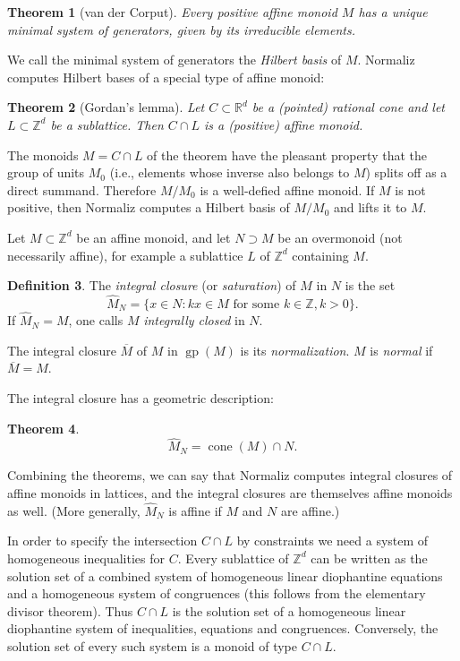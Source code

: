 \documentclass[12pt,a4paper]{scrartcl}
\newtheorem{theorem}{Theorem}
\theoremstyle{definition}
\newtheorem{definition}[theorem]{Definition}
\def\ZZ{{\mathbb Z}}
\def\RR{{\mathbb R}}
\DeclareMathOperator{\gp}{gp}
\DeclareMathOperator{\cone}{cone}
\begin{document}
\begin{theorem}[van der Corput]
	Every positive affine monoid $M$ has a unique minimal system of generators, given by its irreducible elements.
\end{theorem}

We call the minimal system of generators the \emph{Hilbert basis} of $M$. Normaliz computes Hilbert bases of a special type of affine monoid:

\begin{theorem}[Gordan's lemma]
	Let $C\subset\RR^d$ be a (pointed) rational cone and let $L\subset \ZZ^d$ be a sublattice. Then $C\cap L$ is a (positive) affine monoid.
\end{theorem}

The monoids $M=C\cap L$ of the theorem have the pleasant property that the group of units $M_0$ (i.e., elements whose inverse also belongs to $M$) splits off as a direct summand. Therefore $M/M_0$ is a well-defied affine monoid. If $M$ is not positive, then Normaliz computes a Hilbert basis of $M/M_0$ and lifts it to $M$.

Let $M\subset \ZZ^d$ be an affine monoid, and let $N\supset M$ be an overmonoid (not necessarily affine), for example a sublattice $L$ of $\ZZ^d$ containing $M$.

\begin{definition}
	The \emph{integral closure} (or \emph{saturation}) of $M$ in $N$ is the set
	$$
	\widehat M_N=\{x\in N: kx\in M \text{ for some } k\in \ZZ, k>0\}.
	$$
	If $\widehat M_N=M$, one calls $M$ \emph{integrally closed} in $N$.
	
	The integral closure $\overline M$ of $M$ in $\gp(M)$ is its \emph{normalization}. $M$ is \emph{normal} if $\overline M=M$.
\end{definition}

The integral closure has a geometric description:

\begin{theorem}\label{incl_cone}
	$$
	\widehat M_N =\cone(M)\cap N.
	$$
\end{theorem}

Combining the theorems, we can say that Normaliz computes integral closures of affine monoids in lattices, and the integral closures are themselves affine monoids as well. (More generally, $\widehat M_N$ is affine if $M$ and $N$ are affine.)

In order to specify the intersection $C\cap L$ by constraints we need a system of homogeneous inequalities for $C$. Every sublattice of $\ZZ^d$ can be written as the solution set of a combined system of homogeneous linear diophantine equations and a homogeneous system of congruences (this follows from the elementary divisor theorem). Thus $C\cap L$ is the solution set of a homogeneous linear diophantine system of inequalities, equations and congruences. Conversely, the solution set of every such system is a monoid of type $C\cap L$.
\end{document}
